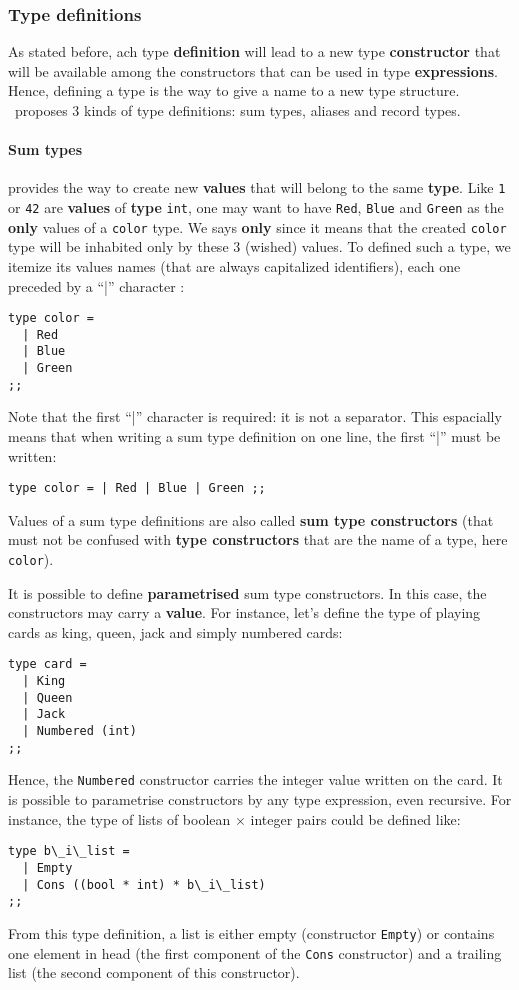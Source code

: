 \subsubsection{Type definitions}
As stated before, ach type {\bf definition} will lead to a new type
{\bf constructor} that will be available among the constructors that
can be used in type {\bf expressions}. Hence, defining a type is the
way to give a name to a new type structure. \focal\ proposes 3 kinds
of type definitions: sum types, aliases and record types.




\paragraph{Sum types} provides the way to create new {\bf values} that
will belong to the same {\bf type}. Like {\tt 1} or {\tt 42} are
{\bf values} of {\bf type} {\tt int}, one may want to have {\tt Red},
{\tt Blue} and {\tt Green} as the {\bf only} values of a {\tt color}
type. We says {\bf only} since it means that the created {\tt color}
type will be inhabited only by these 3 (wished) values. To defined
such a type, we itemize its values names (that are always capitalized
identifiers), each one preceded by a ``|'' character :
{\scriptsize
\begin{lstlisting}
type color =
  | Red
  | Blue
  | Green
;;
\end{lstlisting}
}
Note that the first ``|'' character is required: it is not a
separator. This espacially means that when writing a sum type
definition on one line, the first ``|'' must be written:
{\scriptsize
\begin{lstlisting}
type color = | Red | Blue | Green ;;
\end{lstlisting}
}
Values of a sum type definitions are also called
{\bf sum type constructors} (that must not be confused with
{\bf type constructors} that are the name of a type, here {\tt color}).

It is possible to define {\bf parametrised} sum type constructors. In
this case, the constructors may carry a {\bf value}. For instance,
let's define the type of playing cards as king, queen, jack and simply
numbered cards:
{\scriptsize
\begin{lstlisting}
type card =
  | King
  | Queen
  | Jack
  | Numbered (int)
;;
\end{lstlisting}
}
Hence, the {\tt Numbered} constructor carries the integer value
written on the card. It is possible to parametrise constructors by any
type expression, even recursive.
For instance, the type of lists of boolean $\times$ integer pairs
could be defined like:
{\scriptsize
\begin{lstlisting}
type b\_i\_list =
  | Empty
  | Cons ((bool * int) * b\_i\_list)
;;
\end{lstlisting}
}
From this type definition, a list is either empty (constructor
{\tt Empty}) or contains one element in head (the first component of
the {\tt Cons} constructor) and a trailing list (the second component
of this constructor).

